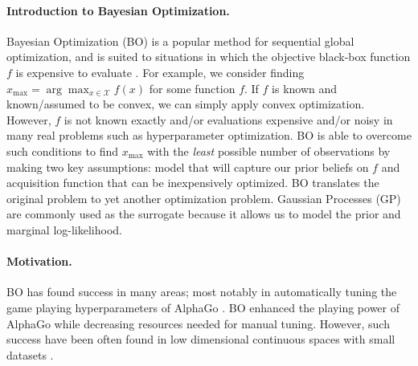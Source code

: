 \documentclass[
    american,a4paper
    ]{scrartcl}
\newcommand{\xmax}{x_{\max}}
\begin{document}
        \paragraph{Introduction to Bayesian Optimization.}
        Bayesian Optimization (BO) is a popular method for sequential global optimization, and is suited to situations in which the objective black-box function $f$ is expensive to evaluate \cite{snoek2012practical,mockus1994application}. 
        For example, we consider finding $\xmax = \arg \max_{x \in {\mathcal X}} f(x)$ for some function $f$.
        If $f$ is known and known/assumed to be convex, we can simply apply convex optimization. 
        However, $f$ is not known exactly and/or evaluations expensive and/or noisy in many real problems such as hyperparameter optimization.
        BO is able to overcome such conditions to find $\xmax$ with the \textit{least} possible number of observations by making two key assumptions:
        model that will capture our prior beliefs on $f$ and acquisition function that can be inexpensively optimized.
        BO translates the original problem to yet another optimization problem.
        Gaussian Processes (GP) are commonly used as the surrogate because it allows us to model the prior and marginal log-likelihood.
        \paragraph{Motivation.}
        BO has found success in many areas; 
        most notably in automatically tuning the game playing hyperparameters of AlphaGo \cite{chen2018bayesian}.
        BO enhanced the playing power of AlphaGo while decreasing resources needed for manual tuning.
        However, such success have been often found in low dimensional \cite{wang2013bayesian} continuous spaces \cite{7352306} with small datasets \cite{ambikasaran2015fast}.
\end{document}
